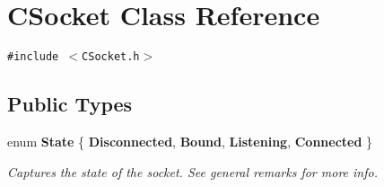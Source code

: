 \section{CSocket  Class Reference}
\label{classCSocket}
{\tt \#include $<$CSocket.h$>$}

\subsection*{Public Types}
\begin{CompactItemize}
\item 
enum {\bf State} \{ {\bf Disconnected}, 
{\bf Bound}, 
{\bf Listening}, 
{\bf Connected}
 \}
\begin{CompactList}\small\item\em Captures the state of the socket. See general remarks for more info.\item\end{CompactList}\end{CompactItemize}
